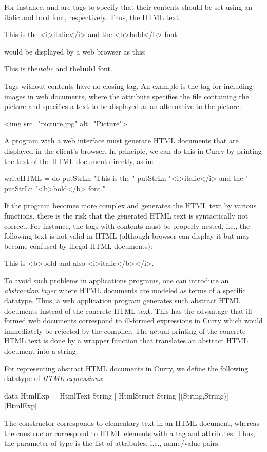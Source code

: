 For instance,  and  are tags to specify that
their contents should be set using an italic and bold font, respectively.
Thus, the HTML text
\begin{prog}
This is the <i>italic</i> and the <b>bold</b> font.
\end{prog}
would be displayed by a web browser as this:
\begin{prog}
{\rm This is the{\it italic} and the{\bf bold} font.}
\end{prog}
Tags without contents have no closing tag. An example
is the tag for including images in web documents, where the
attribute  specifies the file containing the picture
and  specifies a text to be displayed as an alternative
to the picture:
\begin{prog}
<img src="picture.jpg" alt="Picture">
\end{prog}
A program with a web interface must generate HTML documents
that are displayed in the client's browser.
In principle, we can do this in Curry by printing
the text of the HTML document directly, as in:
\begin{prog}
writeHTML = do
  putStrLn "This is the "
  putStrLn "<i>italic</i> and the "
  putStrLn "<b>bold</b> font."
\end{prog}
If the program becomes more complex and generates the HTML text
by various functions, there is the risk that the generated HTML text
is syntactically not correct. For instance, the tags with contents
must be properly nested, i.e., the following text is not valid in HTML
(although browser can display it but may become confused by illegal
HTML documents):
\begin{prog}
This is <b>bold and also <i>italic</b></i>.
\end{prog}
%
To avoid such problems in applications programs,
one can introduce an \emph{abstraction layer}
where HTML documents are modeled as terms of
a specific datatype.
Thus, a web application program generates such abstract HTML documents
instead of the concrete HTML text.
This has the advantage that ill-formed web documents correspond
to ill-formed expressions in Curry which would immediately be rejected
by the compiler. The actual printing of the concrete HTML text
is done by a wrapper function that translates an abstract HTML document
into a string.

For representing abstract HTML documents in Curry,
we define the following datatype of
\emph{HTML expressions}:
\begin{prog}
data HtmlExp = HtmlText   String                              
             | HtmlStruct String [(String,String)] [HtmlExp]
\end{prog}
%
The constructor  corresponds to elementary text
in an HTML document, whereas the constructor 
correspond to HTML elements with a tag and attributes.
Thus, the parameter of type  is the list of
attributes, i.e., name/value pairs.

